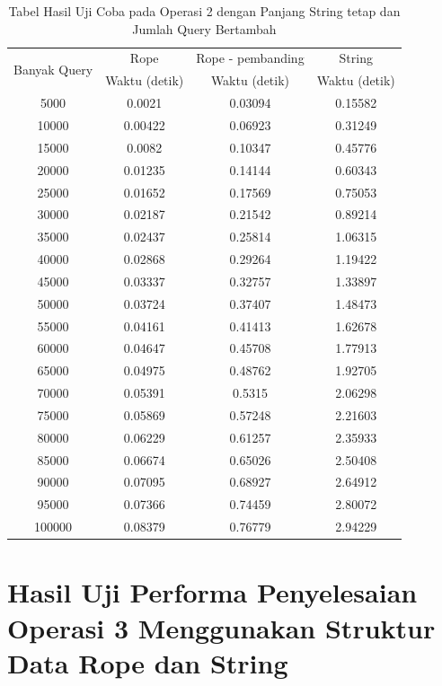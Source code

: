 \begin{appendices}
  \begin{table}[h]
    \centering
  	  \begin{tabular}{|c|c|c|c|}
 		  \hline
 		  \multirow{2}{*}{Banyak Query} & Rope & Rope - pembanding & String\\
 		    		  & Waktu (detik) & Waktu (detik) & Waktu (detik)\\ \hline
  		  5000	& 0.0021	& 0.03094	& 0.15582\\ \hline
  		  10000	& 0.00422	& 0.06923	& 0.31249\\ \hline
  		  15000	& 0.0082	& 0.10347	& 0.45776\\ \hline
  		  20000	& 0.01235	& 0.14144	& 0.60343\\ \hline
  		  25000	& 0.01652	& 0.17569	& 0.75053\\ \hline
  		  30000	& 0.02187	& 0.21542	& 0.89214\\ \hline
  		  35000	& 0.02437	& 0.25814	& 1.06315\\ \hline
  		  40000	& 0.02868	& 0.29264	& 1.19422\\ \hline
  		  45000	& 0.03337	& 0.32757	& 1.33897\\ \hline
  		  50000	& 0.03724	& 0.37407	& 1.48473\\ \hline
  		  55000	& 0.04161	& 0.41413	& 1.62678\\ \hline
  		  60000	& 0.04647	& 0.45708	& 1.77913\\ \hline
  		  65000	& 0.04975	& 0.48762	& 1.92705\\ \hline
  		  70000	& 0.05391	& 0.5315	& 2.06298\\ \hline
  		  75000	& 0.05869	& 0.57248	& 2.21603\\ \hline
  		  80000	& 0.06229	& 0.61257	& 2.35933\\ \hline
  		  85000	& 0.06674	& 0.65026	& 2.50408\\ \hline
  		  90000	& 0.07095	& 0.68927	& 2.64912\\ \hline
  		  95000	& 0.07366	& 0.74459	& 2.80072\\ \hline
  		  100000	& 0.08379	& 0.76779	& 2.94229\\ \hline
  	  \end{tabular}\caption{Tabel Hasil Uji Coba pada Operasi 2 dengan Panjang String tetap dan Jumlah Query Bertambah}
  	  \label{tab:operasi2query}
    \end{table}
    
  \chapter{Hasil Uji Performa Penyelesaian Operasi 3 Menggunakan Struktur Data Rope dan String}
  \setcounter{figure}{0}
  \renewcommand{\thetable}{D.\arabic{table}}
  \renewcommand{\thefigure}{D.\arabic{figure}}
  

\end{appendices}
